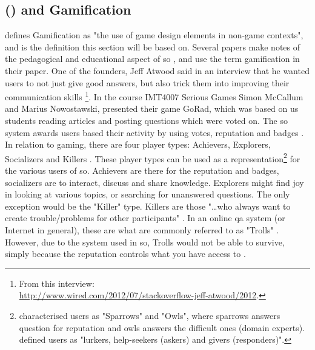 \subsection[Stack Overflow and Gamification]{ () and Gamification}
\label{sec:stackoverflow_gamification}
\textcite{Deterding2011} defines Gamification as "the use of game design elements in non-game contexts", and is the definition this section will be based on. 
Several papers make notes of the pedagogical and educational aspect of \gls{so} \cite{Nasehi2012, Posnett2012, Yang2014}, and \cite{Nasehi2012, Yang2014} use the term gamification in their paper.
One of the founders, Jeff Atwood said in an interview that he wanted users to not just give good answers, but also trick them into improving their communication skills \cite{Posnett2012}\footnote{
	From this interview: \\ 
	\url{http://www.wired.com/2012/07/stackoverflow-jeff-atwood/2012}.
	}.
In the course IMT4007 Serious Games Simon McCallum and Marius Nowostawski, presented their game GoRad, which was based on us students reading articles and posting questions which were voted on. 
The \gls{so} system awards users based their activity by using votes, reputation and badges \cite{M.Sewak2010, Movshovitz-Attias2013, Treude2011, StackOverflow.com2016, StackOverflow.com2016d}.
In relation to gaming, there are four player types: Achievers, Explorers, Socializers and Killers \cite[p.~3]{Maan2013}.
\vspace{0.5em}\newline
These player types can be used as a representation\footnote{	
	\textcite{Yang2014} characterised users as "Sparrows" and "Owls", where sparrows answers question for reputation and owls answers the difficult ones (domain experts).  \\
	\textcite[p.~2]{Ahmed2015} defined users as "lurkers, help-seekers (askers) and givers (responders)".	
	} for the various users of \gls{so}. 
Achievers are there for the reputation and badges, socializers are to interact, discuss and share knowledge. 
Explorers might find joy in looking at various topics, or searching for unanswered questions.
The only exception would be the "Killer" type. 
Killers are those "\ldots who always want to create trouble/problems for other participants" \cite[p.~3]{Maan2013}. 
In an online \gls{qa} system (or Internet in general), these are what are commonly referred to as "Trolls" \cite{Fosdick2012, Atwood2015}. 
However, due to the system used in \gls{so}, Trolls would not be able to survive, simply because the reputation controls what you have access to \cite{StackOverflow.com2016g}. 
